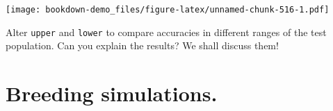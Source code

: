 \documentclass[
]{book}
\begin{document}
\texttt{[image: bookdown-demo\_files/figure-latex/unnamed-chunk-516-1.pdf]}

Alter \texttt{upper} and \texttt{lower} to compare accuracies in different ranges of the test population.
Can you explain the results? We shall discuss them!

\hypertarget{Breeding-simulations}{%
\chapter{Breeding simulations.}\label{Breeding-simulations}}

\backmatter

  

\printindex
\end{document}

